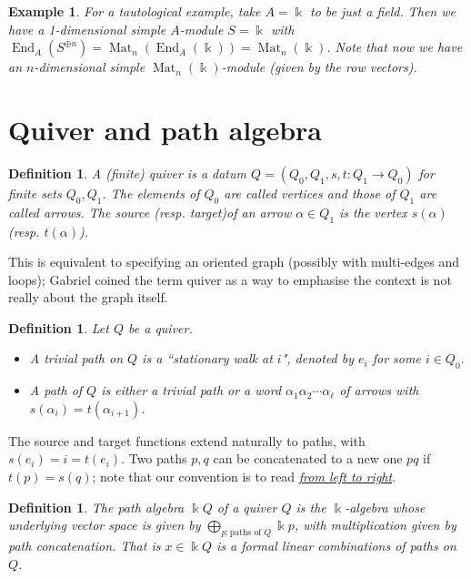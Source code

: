 \documentclass[11pt,a4paper]{article}
\numberwithin{equation}{section}
\theoremstyle{all}
\newtheorem{example}[theorem]{Example}
\newtheorem{definition}[theorem]{Definition}
\theoremstyle{remark}
\newcommand{\rad}{\operatorname{rad}\nolimits}
\newcommand{\End}{\operatorname{End}\nolimits}
\newcommand{\Mat}{\operatorname{Mat}\nolimits}
\newcommand{\defn}[1]{\textsl{\color{darkblue} #1}}
\begin{document}
\begin{example}
For a tautological example, take $A=\Bbbk$ to be just a field.  Then we have a 1-dimensional simple $A$-module $S=\Bbbk$ with
$\End_A(S^{\oplus n})=\Mat_n(\End_A(\Bbbk))=\Mat_n(\Bbbk)$.  Note that now we have an $n$-dimensional simple $\Mat_n(\Bbbk)$-module (given by the row vectors).
\end{example}



\pagebreak


\section{Quiver and path algebra}

\begin{definition}
A (finite) \defn{quiver} is a datum $Q=(Q_0, Q_1, s,t:Q_1\to Q_0)$ for finite sets $Q_0, Q_1$.  The elements of $Q_0$ are called \defn{vertices} and those of $Q_1$ are called \defn{arrows}.  The \defn{source} (resp. \defn{target})of an arrow $\alpha\in Q_1$ is the vertex $s(\alpha)$ (resp. $t(\alpha)$).
\end{definition}
This is equivalent to specifying an oriented graph (possibly with multi-edges and loops); Gabriel coined the term quiver as a way to emphasise the context is not really about the graph itself.

\begin{definition}
Let $Q$ be a quiver.
\begin{itemize}
\item A \defn{trivial path} on $Q$ is a ``stationary walk at $i$", denoted by $e_i$ for some $i\in Q_0$.

\item A \defn{path} of $Q$ is either a trivial path or a word $\alpha_1\alpha_{2}\cdots \alpha_{\ell}$ of arrows with $s(\alpha_i)=t(\alpha_{i+1})$.
\end{itemize}
\end{definition}

The source and target functions extend naturally to paths, with $s(e_i)=i=t(e_i)$.
Two paths $p,q$ can be concatenated to a new one $pq$ if $t(p)=s(q)$; note that our convention is to read \underline{\emph{from left to right}}.

\begin{definition}
The \defn{path algebra} $\Bbbk Q$ of a quiver $Q$ is the $\Bbbk$-algebra whose underlying vector space is given by $\bigoplus_{p:\text{paths of }Q} \Bbbk p$, with multiplication given by path concatenation.  That is $x\in \Bbbk Q$ is a formal linear combinations of paths on $Q$.
\end{definition}
\end{document}
